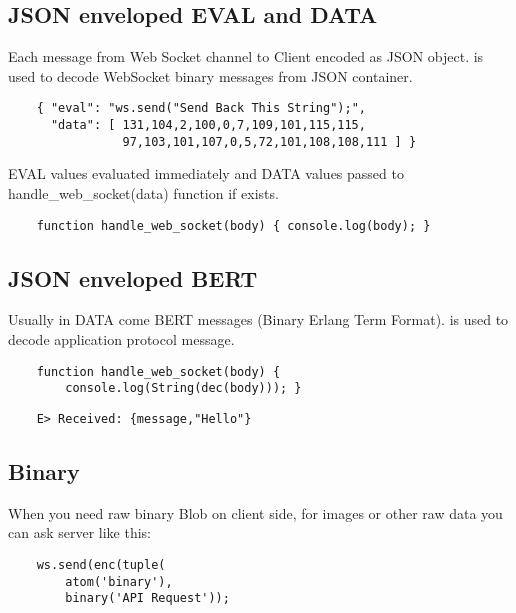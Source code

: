 \subsection*{JSON enveloped EVAL and DATA}

Each message from Web Socket channel to Client encoded as JSON object.
is used to decode WebSocket binary messages from JSON container.

\begin{lstlisting}
    { "eval": "ws.send("Send Back This String");",
      "data": [ 131,104,2,100,0,7,109,101,115,115,
                97,103,101,107,0,5,72,101,108,108,111 ] }
\end{lstlisting}

EVAL values evaluated immediately and DATA values passed
to handle\_web\_socket(data) function if exists.

\begin{lstlisting}
    function handle_web_socket(body) { console.log(body); }
\end{lstlisting}

\subsection*{JSON enveloped BERT}

Usually in DATA come BERT messages (Binary Erlang Term Format).
is used to decode application protocol message.

\begin{lstlisting}
    function handle_web_socket(body) {
        console.log(String(dec(body))); }
\end{lstlisting}

\begin{lstlisting}
    E> Received: {message,"Hello"}
\end{lstlisting}

\subsection{Binary}

When you need raw binary Blob on client side,
for images or other raw data you can ask server like this:

\vspace{1\baselineskip}
\begin{lstlisting}
    ws.send(enc(tuple(
        atom('binary'),
        binary('API Request'));
\end{lstlisting}
\vspace{1\baselineskip}

